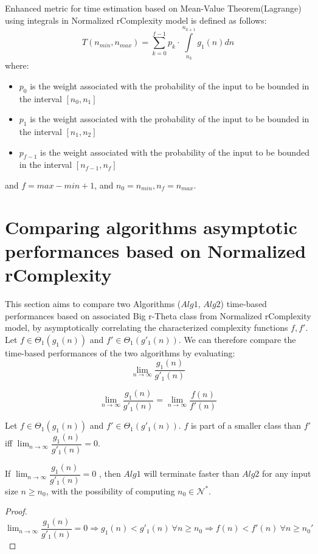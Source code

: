 \begin{definition} Enhanced metric for time estimation based on Mean-Value Theorem(Lagrange) using integrals in Normalized rComplexity model is defined as follows:
\[  T(n_{min}, n_{max}) =\sum\limits_{k=0}^{f-1} p_{k} \cdot \int\limits_{n_{k}}^{n_{k+1}} g_{1}(n) dn  \]
where:
\begin{itemize}
	\item $p_{0}$ is the weight associated with the probability of the input to be bounded in the interval $[n_{0}, n_{1}]$
	\item $p_{1}$ is the weight associated with the probability of the input to be bounded in the interval $[n_{1}, n_{2}]$
	\item $p_{f-1}$ is the weight associated with the probability of the input to be bounded in the interval $[n_{f-1}, n_{f}]$
\end{itemize}
and $f = max - min + 1$, and $n_{0} = n_{min}, n_{f} = n_{max}$.
\end{definition}

\section{Comparing algorithms asymptotic performances based on Normalized rComplexity}


This section aims to compare two Algorithms ($Alg1$, $Alg2$) time-based performances based on associated Big r-Theta class from Normalized rComplexity model, by asymptotically correlating the characterized complexity functions $f, f'$. \\
Let $f \in \Theta_{1}(g_{1}(n))$ and $f' \in \Theta_{1}(g'_{1}(n))$.
We can therefore compare the time-based performances of the two algorithms by evaluating:  \[\lim_{n\to\infty} \dfrac{g_{1}(n)}{g'_{1}(n)}\]

\begin{remark}
\[\lim_{n\to\infty} \dfrac{g_{1}(n)}{g'_{1}(n)} = \lim_{n\to\infty} \dfrac{f(n)}{f'(n)}\]
\end{remark}

\begin{definition}
Let $f \in \Theta_{1}(g_{1}(n))$ and $f' \in \Theta_{1}(g'_{1}(n))$. $f$ is part of a smaller class than $f'$ iff $\lim_{n\to\infty} \dfrac{g_{1}(n)}{g'_{1}(n)} = 0$.
\end{definition}
\begin{lemma}
If  $ \lim_{n\to\infty} \dfrac{g_{1}(n)}{g'_{1}(n)} = 0 $ , then $Alg1$ will terminate faster than $Alg2$ for any input size $n \geq n_{0}$, with the possibility of computing $n_{0} \in \mathcal{N}^{*}$.
\end{lemma}
\begin{proof}
$\lim_{n\to\infty} \dfrac{g_{1}(n)}{g'_{1}(n)} = 0 \Rightarrow g_{1}(n) < g'_{1}(n)\ \forall n \geq n_{0} \Rightarrow f(n) < f'(n) \ \forall n \geq n_{0}'$
\end{proof}


